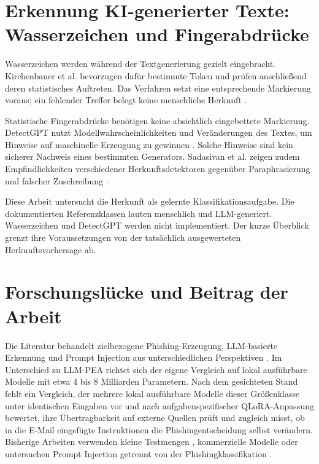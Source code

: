 \documentclass[12pt,twoside=false,a4paper,parskip]{scrbook}
\begin{document}
\section{Erkennung KI-generierter Texte: Wasserzeichen und Fingerabdrücke}\label{sec:ki-herkunft}

Wasserzeichen werden während der Textgenerierung gezielt eingebracht. Kirchenbauer et al. bevorzugen dafür bestimmte Token und prüfen anschließend deren statistisches Auftreten. Das Verfahren setzt eine entsprechende Markierung voraus; ein fehlender Treffer belegt keine menschliche Herkunft \cite{kirchenbauer2023watermark}.

Statistische Fingerabdrücke benötigen keine absichtlich eingebettete Markierung. DetectGPT nutzt Modellwahrscheinlichkeiten und Veränderungen des Textes, um Hinweise auf maschinelle Erzeugung zu gewinnen \cite{mitchell2023detectgpt}. Solche Hinweise sind kein sicherer Nachweis eines bestimmten Generators. Sadasivan et al. zeigen zudem Empfindlichkeiten verschiedener Herkunftsdetektoren gegenüber Paraphrasierung und falscher Zuschreibung \cite{sadasivan2023detection}.

Diese Arbeit untersucht die Herkunft als gelernte Klassifikationsaufgabe. Die dokumentierten Referenzklassen lauten menschlich und LLM-generiert. Wasserzeichen und DetectGPT werden nicht implementiert. Der kurze Überblick grenzt ihre Voraussetzungen von der tatsächlich ausgewerteten Herkunftsvorhersage ab.

\section{Forschungslücke und Beitrag der Arbeit}\label{sec:forschungsluecke}

Die Literatur behandelt zielbezogene Phishing-Erzeugung, LLM-basierte Erkennung und Prompt Injection aus unterschiedlichen Perspektiven \cite{hazell2023spear,heiding2024devising,heiding2024automated,zhang2025benchmarking,liu2024formalizing,greshake2023indirect}. Im Unterschied zu LLM-PEA richtet sich der eigene Vergleich auf lokal ausführbare Modelle mit etwa 4 bis 8 Milliarden Parametern. Nach dem gesichteten Stand fehlt ein Vergleich, der mehrere lokal ausführbare Modelle dieser Größenklasse unter identischen Eingaben vor und nach aufgabenspezifischer QLoRA-Anpassung bewertet, ihre Übertragbarkeit auf externe Quellen prüft und zugleich misst, ob in die E-Mail eingefügte Instruktionen die Phishingentscheidung selbst verändern. Bisherige Arbeiten verwenden kleine Testmengen \cite{heiding2024devising,zhang2025benchmarking}, kommerzielle Modelle \cite{hasan2025phishing} oder untersuchen Prompt Injection getrennt von der Phishingklassifikation \cite{liu2024formalizing,abdelnabi2025llmail}.
\end{document}
